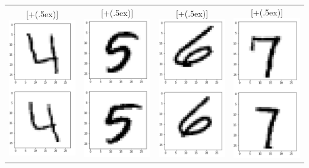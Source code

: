 \documentclass[11pt,letterpaper]{article}
\newcommand*{\addheight}[2][.5ex]{%
  \raisebox{0pt}[\dimexpr\height+(#1)\relax]{#2}%
}
\begin{document}
\begin{tabular}{|c|c|c|c|}
      \addheight{\includegraphics[width=30mm]{img/1-d/4.png}} &
      \addheight{\includegraphics[width=30mm]{img/1-d/5.png}} &
      \addheight{\includegraphics[width=30mm]{img/1-d/6.png}} &
      \addheight{\includegraphics[width=30mm]{img/1-d/7.png}} \\

\end{tabular}
\end{document}
